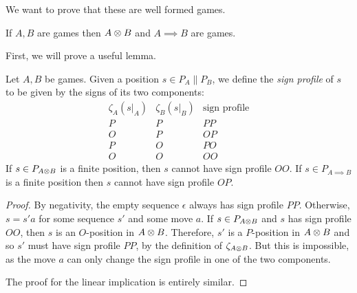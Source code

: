\documentclass{article}
\begin{document}
We want to prove that these are well formed games.

\begin{proposition}\label{TensorImpliesWellFormed}
  If $A,B$ are games then $A\otimes B$ and $A\implies B$ are games.
\end{proposition}

First, we will prove a useful lemma.

\begin{lemma}\label{signProfilesLemma}
  Let $A,B$ be games.  Given a position $s\in P_A\|P_B$, we define the \emph{sign profile} of $s$ to be given by the signs of its two components:
  \[
    \begin{array}{cc|c}
      \zeta_A(s\vert_A) & \zeta_B(s\vert_B) & \textrm{sign profile} \\
      \hline
      P & P & PP \\
      O & P & OP \\
      P & O & PO \\
      O & O & OO
    \end{array}
    \]
  If $s\in P_{A\otimes B}$ is a finite position, then $s$ cannot have sign profile $OO$.  If $s\in P_{A\implies B}$ is a finite position then $s$ cannot have sign profile $OP$.  
  \begin{proof}
    By negativity, the empty sequence $\epsilon$ always has sign profile $PP$.  Otherwise, $s=s'a$ for some sequence $s'$ and some move $a$.  If $s\in P_{A\otimes B}$ and $s$ has sign profile $OO$, then $s$ is an $O$-position in $A\otimes B$.  Therefore, $s'$ is a $P$-position in $A\otimes B$ and so $s'$ must have sign profile $PP$, by the definition of $\zeta_{A\otimes B}$.  But this is impossible, as the move $a$ can only change the sign profile in one of the two components.  

    The proof for the linear implication is entirely similar.
  \end{proof}
\end{lemma}
\end{document}
